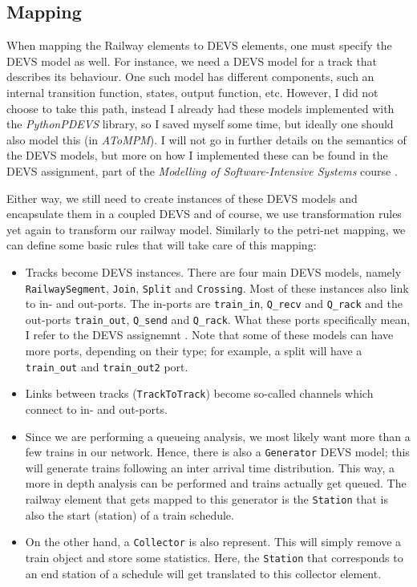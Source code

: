 \documentclass{article}
\begin{document}
\subsection{Mapping}

When mapping the Railway elements to DEVS elements, one must specify the DEVS model as well. For instance, we need a DEVS model for a track that describes its behaviour. One such model has different components, such an internal transition function, states, output function, etc. However, I did not choose to take this path, instead I already had these models implemented with the \textit{PythonPDEVS} library, so I saved myself some time, but ideally one should also model this (in \textit{AToMPM}). I will not go in further details on the semantics of the DEVS models, but more on how I implemented these can be found in the DEVS assignment, part of the \textit{Modelling of Software-Intensive Systems} course \cite{devs_assignment}.

Either way, we still need to create instances of these DEVS models and encapsulate them in a coupled DEVS and of course, we use transformation rules yet again to transform our railway model. Similarly to the petri-net mapping, we can define some basic rules that will take care of this mapping:

\begin{itemize}
    \item Tracks become DEVS instances. There are four main DEVS models, namely \texttt{RailwaySegment}, \texttt{Join}, \texttt{Split} and \texttt{Crossing}. Most of these instances also link to in- and out-ports. The in-ports are \texttt{train\_in}, \texttt{Q\_recv} and \texttt{Q\_rack} and the out-ports \texttt{train\_out}, \texttt{Q\_send} and \texttt{Q\_rack}. What these ports specifically mean, I refer to the DEVS assignemnt \cite{devs_assignment}. Note that some of these models can have more ports, depending on their type; for example, a split will have a \texttt{train\_out} and \texttt{train\_out2} port.
    \item Links between tracks (\texttt{TrackToTrack}) become so-called channels which connect to in- and out-ports.
    \item Since we are performing a queueing analysis, we most likely want more than a few trains in our network. Hence, there is also a \texttt{Generator} DEVS model; this will generate trains following an inter arrival time distribution. This way, a more in depth analysis can be performed and trains actually get queued. The railway element that gets mapped to this generator is the \texttt{Station} that is also the start (station) of a train schedule.
    \item On the other hand, a \texttt{Collector} is also represent. This will simply remove a train object and store some statistics. Here, the \texttt{Station} that corresponds to an end station of a schedule will get translated to this collector element.
\end{itemize}
\end{document}
